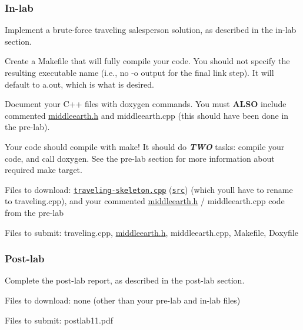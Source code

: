\subsubsection*{In-\/lab}


\begin{DoxyEnumerate}
\item Implement a brute-\/force traveling salesperson solution, as described in the in-\/lab section.
\item Create a Makefile that will fully compile your code. You should not specify the resulting executable name (i.\+e., no {\ttfamily -\/o} output for the final link step). It will default to a.\+out, which is what is desired.
\item Document your C++ files with doxygen commands. You must {\bfseries A\+L\+SO} include commented \hyperlink{middleearth_8h_source}{middleearth.\+h} and middleearth.\+cpp (this should have been done in the pre-\/lab).
\item Your code should compile with {\ttfamily make}! It should do {\itshape {\bfseries T\+WO}} tasks\+: compile your code, and call {\ttfamily doxygen}. See the pre-\/lab section for more information about required make target.
\item Files to download\+: \href{traveling-skeleton.cpp.html}{\tt traveling-\/skeleton.\+cpp} (\href{traveling-skeleton.cpp}{\tt src}) (which you\textquotesingle{}ll have to rename to traveling.\+cpp), and your commented \hyperlink{middleearth_8h_source}{middleearth.\+h} / middleearth.\+cpp code from the pre-\/lab
\item Files to submit\+: traveling.\+cpp, \hyperlink{middleearth_8h_source}{middleearth.\+h}, middleearth.\+cpp, Makefile, Doxyfile
\end{DoxyEnumerate}

\subsubsection*{Post-\/lab}


\begin{DoxyEnumerate}
\item Complete the post-\/lab report, as described in the post-\/lab section.
\item Files to download\+: none (other than your pre-\/lab and in-\/lab files)
\item Files to submit\+: postlab11.\+pdf 


\end{DoxyEnumerate}

